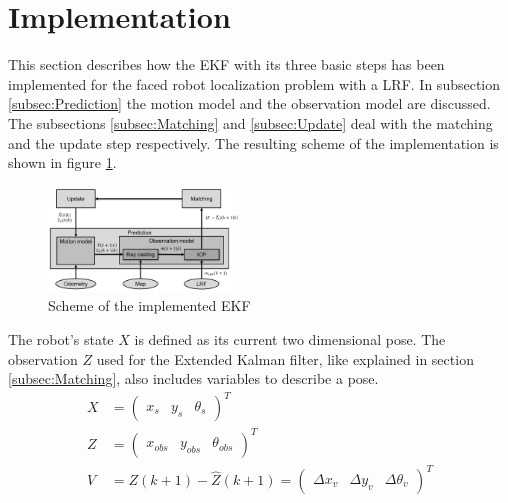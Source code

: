 \section{Implementation}
\label{sec:Implementation}


This section describes how the EKF with its three basic steps has been implemented for the faced robot localization problem with a LRF. In subsection \ref{subsec:Prediction} the motion model and the observation model are discussed. The subsections \ref{subsec:Matching} and \ref{subsec:Update} deal with the matching and the update step respectively. The resulting scheme of the implementation is shown in figure \ref{fig:EKF_scheme}. 

\begin{figure}[h]
\centering
\includegraphics[width=0.45\textwidth]{figures/scheme}
      \caption{Scheme of the implemented EKF}
      \label{fig:EKF_scheme}
\end{figure}

The robot's state $X$ is defined as its current two dimensional pose. The observation $Z$ used for the Extended Kalman filter, like explained in section \ref{subsec:Matching}, also includes variables to describe a pose. 
\begin{align}
X&=\begin{pmatrix}x_s & y_s & \theta_s \end{pmatrix}^T \label{eq:state_def} \\
Z&=\begin{pmatrix}x_{obs} & y_{obs} & \theta_{obs} \end{pmatrix}^T \label{eq:observation_def}\\
V&=Z(k+1)-\hat{Z}(k+1)=\begin{pmatrix} \Delta x_{v} & \Delta y_{v} & \Delta \theta_{v} \end{pmatrix}^T \label{eq:v_def}
\end{align}

